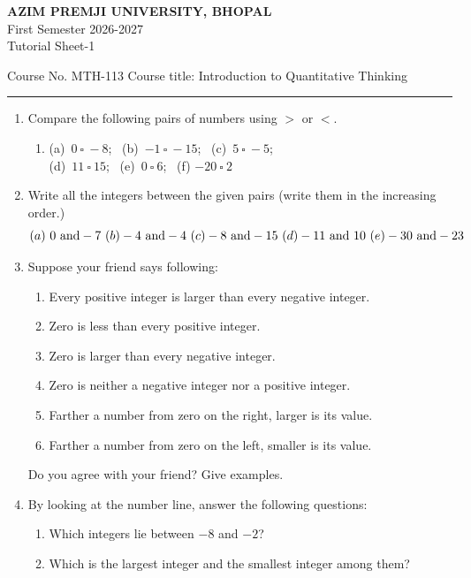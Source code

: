 \documentclass[a4paper,leqno,12pt]{amsart}
\begin{document}
\begin{center}
{{\textbf{ AZIM PREMJI UNIVERSITY, BHOPAL}\\
First Semester  2026-2027\\
Tutorial Sheet-1 }}
\end{center}

\noindent Course No. MTH-113 \hfill  Course title: Introduction to Quantitative Thinking
\vspace{.3cm}
\hrule 
\vspace{.3cm}


\begin{enumerate}
\setlength\itemsep{1em}
\item Compare the following pairs of numbers using $>$ or $<$.
\begin{enumerate}
\item[] (a)\ $0 \ \square \ -8$; \ (b)\ $-1\ \square \ -15$; \ (c)\ $5\ \square \ -5$; \\ 
(d)\ $11\ \square \ 15$; \ (e)\ $0\ \square \ 6$; \ (f) $-20\ \square \ 2$
\end{enumerate}

\item Write all the integers between the given pairs (write them in the increasing
order.)
\[
(a)\ 0 \ {\rm and} -7 \ (b) -4 \ {\rm and} -4 \ (c) -8 \ {\rm and} -15 \ (d) -11 \ {\rm and} \ 10 \ (e) -30 \ {\rm and} -23
\]
\item Suppose your friend says following:
\begin{enumerate}
\item Every positive integer is larger than every negative integer.
\item Zero is less than every positive integer.
\item Zero is larger than every negative integer.
\item Zero is neither a negative integer nor a positive integer.
\item Farther a number from zero on the right, larger is its value.
\item Farther a number from zero on the left, smaller is its value.
\end{enumerate}
Do you agree with your friend? Give examples.

\item By looking at the number line, answer the following questions:
\begin{enumerate}
\item Which integers lie between $-8$ and $-2$?
\item Which is the largest integer and the smallest integer among them?
\end{enumerate}


\end{enumerate}
\end{document}
